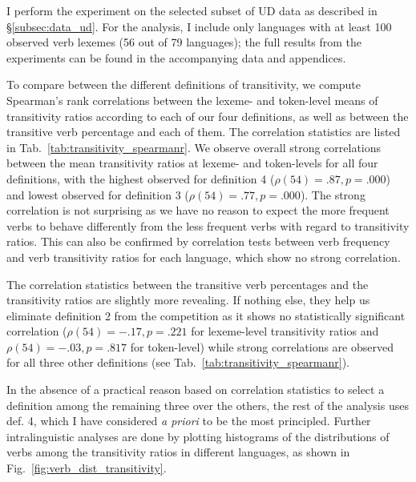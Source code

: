 I perform the experiment on the selected subset of UD data as described in §\ref{subsec:data_ud}. For the analysis, I include only languages with at least 100 observed verb lexemes (56 out of 79 languages); the full results from the experiments can be found in the accompanying data and appendices. 



To compare between the different definitions of transitivity, we compute Spearman's rank correlations between the lexeme- and token-level means of transitivity ratios according to each of our four definitions, as well as between the transitive verb percentage and each of them. The correlation statistics are listed in Tab.~\ref{tab:transitivity_spearmanr}. We observe overall strong correlations between the mean transitivity ratios at lexeme- and token-levels for all four definitions, with the highest observed for definition 4 ($\rho(54)=.87, p=.000$) and lowest observed for definition 3 ($\rho(54)=.77, p=.000$). The strong correlation is not surprising as we have no reason to expect the more frequent verbs to behave differently from the less frequent verbs with regard to transitivity ratios. This can also be confirmed by correlation tests between verb frequency and verb transitivity ratios for each language, which show no strong correlation.

The correlation statistics between the transitive verb percentages and the transitivity ratios are slightly more revealing. If nothing else, they help us eliminate definition 2 from the competition as it shows no statistically significant correlation ($\rho(54)=-.17, p=.221$ for lexeme-level transitivity ratios and $\rho(54)=-.03, p=.817$ for token-level) while strong correlations are observed for all three other definitions (see Tab.~\ref{tab:transitivity_spearmanr}).

In the absence of a practical reason based on correlation statistics to select a definition among the remaining three over the others, the rest of the analysis uses def. 4, which I have considered \textit{a priori} to be the most principled. Further intralinguistic analyses are done by plotting histograms of the distributions of verbs among the transitivity ratios in different languages, as shown in Fig.~\ref{fig:verb_dist_transitivity}.

